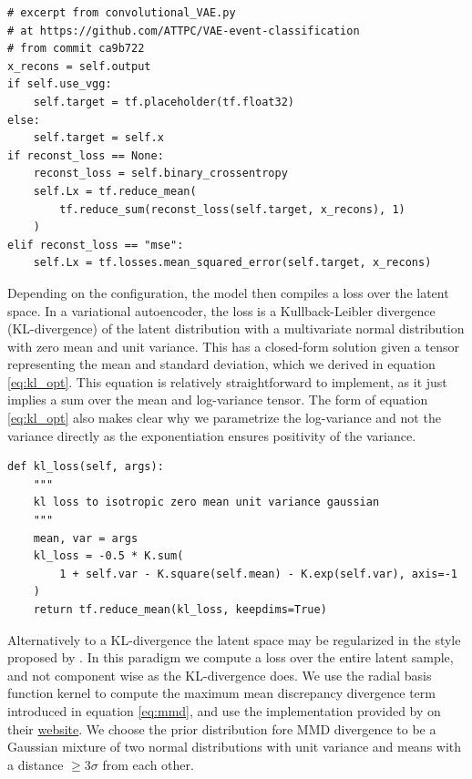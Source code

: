 \begin{minipage}{\linewidth}
\begin{lstlisting}[language=iPython]
# excerpt from convolutional_VAE.py
# at https://github.com/ATTPC/VAE-event-classification
# from commit ca9b722
x_recons = self.output
if self.use_vgg:
    self.target = tf.placeholder(tf.float32)
else:
    self.target = self.x
if reconst_loss == None:
    reconst_loss = self.binary_crossentropy
    self.Lx = tf.reduce_mean(
        tf.reduce_sum(reconst_loss(self.target, x_recons), 1)
    )
elif reconst_loss == "mse":
    self.Lx = tf.losses.mean_squared_error(self.target, x_recons)
\end{lstlisting}
\end{minipage}


Depending on the configuration, the model then compiles a loss over the latent space. In a variational autoencoder, the loss is a  Kullback-Leibler divergence (KL-divergence) of the latent distribution with a multivariate normal distribution with zero mean and unit variance. This has a closed-form solution given a tensor representing the mean and standard deviation, which we derived in equation \ref{eq:kl_opt}. This equation is relatively straightforward to implement, as it just implies a sum over the mean and log-variance tensor. The form of equation \ref{eq:kl_opt} also makes clear why we parametrize the log-variance and not the variance directly as the exponentiation ensures positivity of the variance.


\begin{minipage}{\linewidth}
\begin{lstlisting}[language=iPython]
def kl_loss(self, args):
    """
    kl loss to isotropic zero mean unit variance gaussian
    """
    mean, var = args
    kl_loss = -0.5 * K.sum(
        1 + self.var - K.square(self.mean) - K.exp(self.var), axis=-1
    )
    return tf.reduce_mean(kl_loss, keepdims=True)
\end{lstlisting}
\end{minipage}

Alternatively to a KL-divergence the latent space may be regularized in the style proposed by \citet{Zhao}. In this paradigm we compute a loss over the entire latent sample, and not component wise as the KL-divergence does. We use the radial basis function kernel to compute the maximum mean discrepancy divergence term introduced in equation \ref{eq:mmd}, and use the implementation provided by \cite{Zhao} on their \href{http://szhao.me/2017/06/10/a-tutorial-on-mmd-variational-autoencoders.html}{website}. We choose the prior distribution fore MMD divergence to be a Gaussian mixture of two normal distributions with unit variance and means with a distance $\geq 3\sigma$ from each other. 


